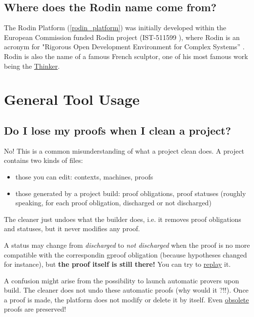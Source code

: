 \subsection{Where does the Rodin name come from?}

The Rodin Platform (\ref{rodin_platform}) was initially developed within the European Commission funded Rodin project (IST-511599 ), where Rodin is an acronym for "Rigorous Open Development Environment for Complex Systems” . Rodin is also the name of a famous French sculptor, one of his most famous work being the \href{http://en.wikipedia.org/wiki/The_Thinker}{Thinker}. 

\section{General Tool Usage}

\subsection{Do I lose my proofs when I clean a project?}
No! This is a common misunderstanding of what a project clean does. A project contains two kinds of files: 

\begin{itemize}
	\item those you can edit: contexts, machines, proofs 
	\item those generated by a project build: proof obligations, proof statuses (roughly speaking, for each proof obligation, discharged or not discharged) 
\end{itemize}

The cleaner just undoes what the builder does, i.e. it removes proof obligations and statuses, but it never modifies any proof.

A status may change from \emph{discharged} to \emph{not discharged} when the proof is no more compatible with the correspondin gproof obligation (because hypotheses changed for instance), but \textbf{the proof itself is still there!}
You can try to \href{http://wiki.event-b.org/index.php/Proof_Obligation_Commands#Proof_Replay_on_Undischarged_POs}{replay} it.

A confusion might arise from the possibility to launch automatic provers upon build. The cleaner does not undo these automatic proofs (why would it ?!!). Once a proof is made, the platform does not modify or delete it by itself. Even \href{http://wiki.event-b.org/index.php/Proof_Purger_Interface#Why_proofs_become_obsolete}{obsolete} proofs are preserved!

